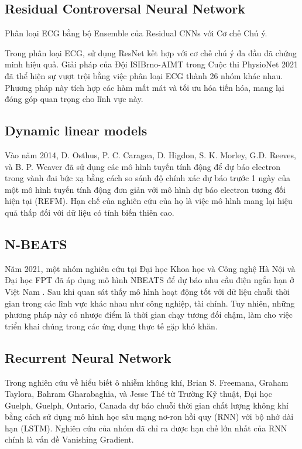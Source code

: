 \documentclass[conference]{IEEEtran}
\begin{document}
\subsection{Residual Controversal Neural Network}
Phân loại ECG bằng bộ Ensemble của Residual CNNs với Cơ chế Chú ý.

Trong phân loại ECG, sử dụng ResNet kết hợp với cơ chế chú ý đa đầu đã chứng minh hiệu quả. Giải pháp của Đội ISIBrno-AIMT trong Cuộc thi PhysioNet 2021 đã thể hiện sự vượt trội bằng việc phân loại ECG thành 26 nhóm khác nhau. Phương pháp này tích hợp các hàm mất mát và tối ưu hóa tiến hóa, mang lại đóng góp quan trọng cho lĩnh vực này. \cite{b4}

\subsection{Dynamic linear models}
Vào năm 2014, D. Osthus, P. C. Caragea, D. Higdon, S. K. Morley, G.D. Reeves, và B. P. Weaver đã sử dụng các mô hình tuyến tính động để dự báo electron trong vành đai bức xạ bằng cách so sánh độ chính xác dự báo trước 1 ngày của một mô hình tuyến tính động đơn giản với mô hình dự báo electron tương đối hiện tại (REFM)\cite{b6}. Hạn chế của nghiên cứu của họ là việc mô hình mang lại hiệu quả thấp đối với dữ liệu có tính biến thiên cao.

\subsection{N-BEATS}
Năm 2021, một nhóm nghiên cứu tại Đại học Khoa học và Công nghệ Hà Nội và Đại học FPT đã áp dụng mô hình NBEATS để dự báo nhu cầu điện ngắn hạn ở Việt Nam \cite{b7}. Sau khi quan sát thấy mô hình hoạt động tốt với dữ liệu chuỗi thời gian trong các lĩnh vực khác nhau như công nghiệp, tài chính. Tuy nhiên, những phương pháp này có nhược điểm là thời gian chạy tương đối chậm, làm cho việc triển khai chúng trong các ứng dụng thực tế gặp khó khăn.

\subsection{Recurrent Neural Network}
Trong nghiên cứu về hiểu biết ô nhiễm không khí, Brian S. Freemana, Graham Taylora, Bahram Gharabaghia, và Jesse Thé từ Trường Kỹ thuật, Đại học Guelph, Guelph, Ontario, Canada dự báo chuỗi thời gian chất lượng không khí bằng cách sử dụng mô hình học sâu mạng nơ-ron hồi quy (RNN) với bộ nhớ dài hạn (LSTM)\cite{b10}. Nghiên cứu của nhóm đã chỉ ra được hạn chế lớn nhất của RNN chính là vấn đề Vanishing Gradient.
\end{document}
